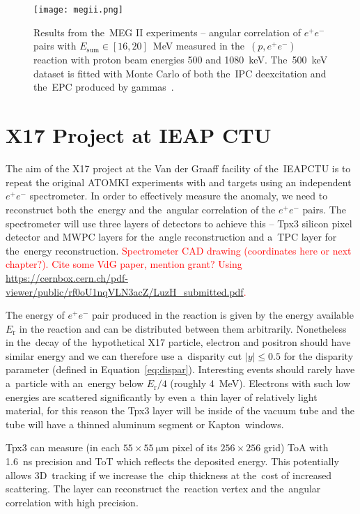 				\begin{figure}
					\centering
					\texttt{[image: megii.png]}
					\caption{Results from the~MEG II experiments -- angular correlation of $e^+e^-$ pairs with $E_\text{sum} \in [16,20]$~MeV measured in the~$(p,e^+e^-)$ reaction with proton beam energies 500 and 1080~keV. The~500~keV dataset is fitted with Monte Carlo of both the~\ac{IPC} deexcitation and the~\ac{EPC} produced by gammas~\cite{megii}.}
					\label{fig:megii}
				\end{figure}
			
	
	\section{X17 Project at IEAP CTU}
	\label{sec:IEAP}
		The aim of the X17 project at the Van der Graaff facility of the~\acl{IEAPCTU} is to repeat the original ATOMKI experiments with  and  targets using an independent $e^+e^-$ spectrometer. In order to effectively measure the anomaly, we need to reconstruct both the~energy and the~angular correlation of the $e^+e^-$ pairs. The spectrometer will use three layers of detectors to achieve this -- \acf{Tpx3} silicon pixel detector and \acf{MWPC} layers for the~angle reconstruction and a~\acf{TPC} layer for the~energy reconstruction. \textcolor{red}{Spectrometer CAD drawing (coordinates here or next chapter?). Cite some VdG paper, mention grant? Using \url{https://cernbox.cern.ch/pdf-viewer/public/rf0oU1nqVLN3acZ/LuzH_submitted.pdf}.}
		
		The energy of $e^+e^-$ pair produced in the reaction is given by the energy available $E_\text{r}$ in the reaction and can be distributed between them arbitrarily. Nonetheless in the~decay of the~hypothetical X17 particle, electron and positron should have similar energy and we can therefore use a~disparity cut $|y| \leq 0.5$ for the disparity parameter (defined in Equation~\ref{eq:dispar}). Interesting events should rarely have a~particle with an~energy below $E_\text{r}/4$ (roughly 4~MeV). Electrons with such low energies are scattered significantly by even a~thin layer of relatively light material, for this reason the \ac{Tpx3} layer will be inside of the vacuum tube and the tube will have a thinned aluminum segment or Kapton\texttrademark\ windows.
		
		\ac{Tpx3} can measure (in each $55\times55~\mathrm{\mu m}$ pixel of its $256\times256$ grid) \ac{ToA} with 1.6~ns precision and \ac{ToT} which reflects the deposited energy. This potentially allows 3D~tracking if we increase the~chip thickness at the~cost of increased scattering. The layer can reconstruct the~reaction vertex and the~angular correlation with high precision.
		
